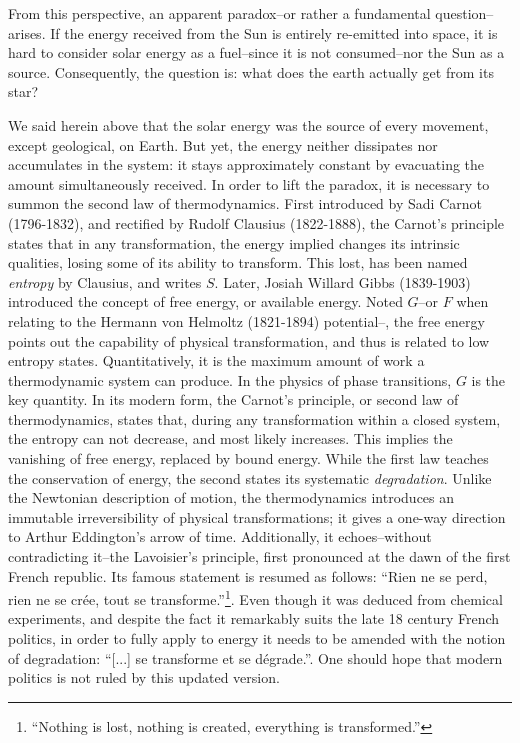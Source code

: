 From this perspective, an apparent paradox\---or rather a fundamental question\---arises. If the energy received from the Sun is entirely re-emitted into space, it is hard to consider solar energy as a fuel\---since it is not consumed\---nor the Sun as a source. Consequently, the question is: what does the earth actually get from its star?

We said herein above that the solar energy was the source of every movement, except geological, on Earth. But yet, the energy neither dissipates nor accumulates in the system: it stays approximately constant by evacuating the amount simultaneously received. 
In order to lift the paradox, it is necessary to summon the second law of thermodynamics. First introduced by Sadi Carnot (1796-1832), and rectified by Rudolf Clausius (1822-1888), the Carnot's principle states that in any transformation, the energy implied changes its intrinsic qualities, losing some of its ability to transform. This lost, has been named \textit{entropy} by Clausius, and writes $S$. 
Later, Josiah Willard Gibbs (1839-1903) introduced the concept of free energy, or available energy. Noted $G$\---or $F$ when relating to the Hermann von Helmoltz (1821-1894) potential\---, the free energy points out the capability of physical transformation, and thus is related to low entropy states. Quantitatively, it is the maximum amount of work a thermodynamic system can produce. In the physics of phase transitions, $G$ is the key quantity.
In its modern form, the Carnot's principle, or second law of thermodynamics, states that, during any transformation within a closed system, the entropy can not decrease, and most likely increases. This implies the vanishing of free energy, replaced by bound energy.
While the first law teaches the conservation of energy, the second states its systematic \textit{degradation}. Unlike the Newtonian description of motion, the thermodynamics introduces an immutable irreversibility of physical transformations; it gives a one-way direction to Arthur Eddington's arrow of time.
Additionally, it echoes\---without contradicting it\---the Lavoisier's principle, first pronounced at the dawn of the first French republic. Its famous statement is resumed as follows: ``Rien ne se perd, rien ne se crée, tout se transforme.''\footnote{``Nothing is lost, nothing is created, everything is transformed.''}. 
Even though it was deduced from chemical experiments, and despite the fact it remarkably suits the late 18 century French politics, in order to fully apply to energy it needs to be amended with the notion of degradation: ``[...] se transforme et se dégrade.''. One should hope that modern politics is not ruled by this updated version.

